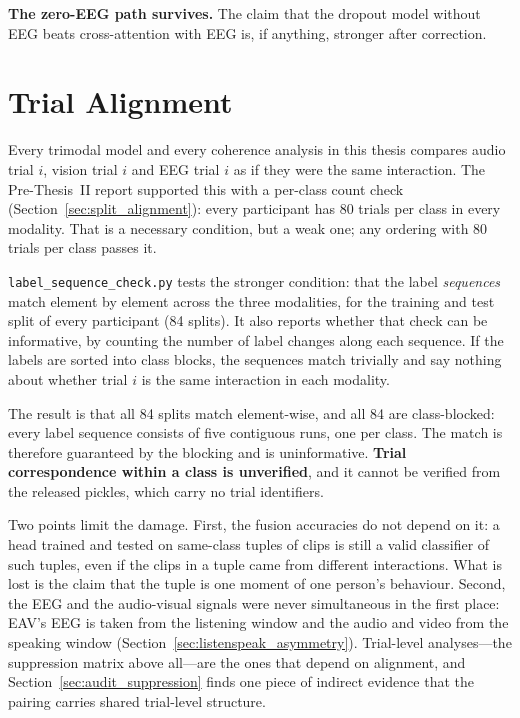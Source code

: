 \textbf{The zero-EEG path survives.} The claim that the dropout model
without EEG beats cross-attention with EEG is, if anything, stronger after correction.

\section{Trial Alignment}
\label{sec:audit_alignment}

Every trimodal model and every coherence analysis in this thesis compares audio trial
$i$, vision trial $i$ and EEG trial $i$ as if they were the same interaction. The
Pre-Thesis~II report supported this with a per-class count check
(Section~\ref{sec:split_alignment}): every participant has 80 trials per class in
every modality. That is a necessary condition, but a weak one; any ordering with 80
trials per class passes it.

\texttt{label\_sequence\_check.py} tests the stronger condition: that the label
\emph{sequences} match element by element across the three modalities, for the
training and test split of every participant (84 splits). It also reports whether that
check can be informative, by counting the number of label changes along each sequence.
If the labels are sorted into class blocks, the sequences match trivially and say
nothing about whether trial $i$ is the same interaction in each modality.

The result is that all 84 splits match element-wise, and all 84 are class-blocked: every
label sequence consists of five contiguous runs, one per class. The match is therefore
guaranteed by the blocking and is uninformative. \textbf{Trial correspondence within a
class is unverified}, and it cannot be verified from the released pickles, which carry
no trial identifiers.

Two points limit the damage. First, the fusion accuracies do not depend on it: a head
trained and tested on same-class tuples of clips is still a valid classifier of such
tuples, even if the clips in a tuple came from different interactions. What is lost is
the claim that the tuple is one moment of one person's behaviour. Second, the EEG and
the audio-visual signals were never simultaneous in the first place: EAV's EEG is
taken from the listening window and the audio and video from the speaking window
(Section~\ref{sec:listenspeak_asymmetry}). Trial-level analyses---the suppression
matrix above all---are the ones that depend on alignment, and Section~\ref{sec:audit_suppression}
finds one piece of indirect evidence that the pairing carries shared trial-level
structure.

